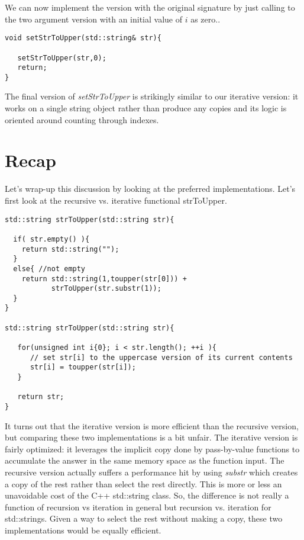 \documentclass[]{tufte-handout}
\begin{document}
We can now implement the version with the original signature by just calling to the two argument version with an initial value of $i$ as zero..
\begin{verbatim}
void setStrToUpper(std::string& str){

   setStrToUpper(str,0);
   return;
}
\end{verbatim}

The final version of \textit{setStrToUpper} is strikingly similar to our iterative version:  it works on a single string object rather than produce any copies and its logic is oriented around counting through indexes.  

\section{Recap}

Let's wrap-up this discussion by looking at the preferred implementations. Let's first look at the recursive vs. iterative functional strToUpper.
\begin{verbatim}
std::string strToUpper(std::string str){

  if( str.empty() ){
    return std::string("");
  }
  else{ //not empty
    return std::string(1,toupper(str[0])) +
           strToUpper(str.substr(1));
  }  
}

std::string strToUpper(std::string str){
   
   for(unsigned int i{0}; i < str.length(); ++i ){
	  // set str[i] to the uppercase version of its current contents
      str[i] = toupper(str[i]);
   }
   
   return str;
}
\end{verbatim}
It turns out that the iterative version is more efficient than the recursive version, but comparing these two implementations is a bit unfair. The iterative version is fairly optimized: it leverages the implicit copy done by pass-by-value functions to accumulate the answer in the same memory space as the function input. The recursive version actually suffers a performance hit by using \textit{substr} which creates a copy of the rest rather than select the rest directly.  This is more or less an unavoidable cost of the C++ std::string class.  So, the difference is not really a function of recursion vs iteration in general but recursion vs. iteration for std::strings.  Given a way to select the rest without making a copy, these two implementations would be equally efficient.  
\end{document}
